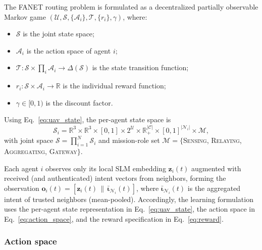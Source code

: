 \documentclass[5p,times]{elsarticle}
\begin{document}
The FANET routing problem is formulated as a decentralized partially observable Markov game $(\mathcal{U}, \mathcal{S}, \{\mathcal{A}_i\}, \mathcal{T}, \{r_i\}, \gamma)$, where:
\begin{itemize}
\item $\mathcal{S}$ is the joint state space;
\item $\mathcal{A}_i$ is the action space of agent $i$;
\item $\mathcal{T}: \mathcal{S} \times \prod_i \mathcal{A}_i \rightarrow \Delta(\mathcal{S})$ is the state transition function;
\item $r_i: \mathcal{S} \times \mathcal{A}_i \rightarrow \mathbb{R}$ is the individual reward function;
\item $\gamma \in [0,1)$ is the discount factor.
\end{itemize}
Using Eq.~\eqref{eq:uav_state}, the per-agent state space is
\begin{equation}
\label{eq:state_space}
\mathcal{S}_i = \mathbb{R}^3 \times \mathbb{R}^3 \times [0,1] \times 2^{\mathcal{U}} \times \mathbb{R}_{+}^{|\mathcal{C}|} \times [0,1]^{|\mathcal{N}_i|} \times \mathcal{M},
\end{equation}
with joint space $\mathcal{S}=\prod_{i=1}^{N}\mathcal{S}_i$ and mission-role set $\mathcal{M}=\{$\textsc{Sensing}, \textsc{Relaying}, \textsc{Aggregating}, \textsc{Gateway}$\}$.

Each agent $i$ observes only its local SLM embedding $\mathbf{z}_i(t)$ augmented with received (and authenticated) intent vectors from neighbors, forming the observation $\mathbf{o}_i(t) = [\mathbf{z}_i(t) \,\|\, \bar{\boldsymbol{\iota}}_{\mathcal{N}_i}(t)]$, where $\bar{\boldsymbol{\iota}}_{\mathcal{N}_i}(t)$ is the aggregated intent of trusted neighbors (mean-pooled).
Accordingly, the learning formulation uses the per-agent state representation in Eq.~\eqref{eq:uav_state}, the action space in Eq.~\eqref{eq:action_space}, and the reward specification in Eq.~\eqref{eq:reward}.

\subsubsection{Action space}
\end{document}

